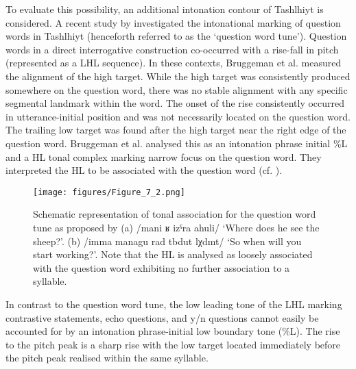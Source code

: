 To evaluate this possibility, an additional intonation contour of Tashlhiyt is considered. A recent study by \citet{Bruggeman.etal2017} investigated the intonational marking of question words in Tashlhiyt (henceforth referred to as the ‘question word tune’). Question words in a direct interrogative construction co-occurred with a rise-fall in pitch (represented as a LHL sequence). In these contexts, Bruggeman et al. measured the alignment of the high target. While the high target was consistently produced somewhere on the question word, there was no stable alignment with any specific segmental landmark within the word. The onset of the rise consistently occurred in utterance-initial position and was not necessarily located on the question word. The trailing low target was found after the high target near the right edge of the question word. Bruggeman et al. analysed this as an intonation phrase initial \%L and a HL tonal complex marking narrow focus on the question word. They interpreted the HL to be associated with the question word (cf. ). 

  \begin{figure}[h!]
  \centering 
   \texttt{[image: figures/Figure\_7\_2.png]}
  \caption{Schematic representation of tonal association for the question word tune as proposed by \citet{Bruggeman.etal2017} (a) /mani ʁ izˤra ahuli/ ‘Where does he see the sheep?’. (b) /imma managu rad tbdut lχdmt/ ‘So when will you start working?’. Note that the HL is analysed as loosely associated with the question word exhibiting no further association to a syllable.}
   \label{fig:7.2}
   \end{figure}
   
In contrast to the question word tune, the low leading tone of the LHL marking contrastive statements, echo questions, and y/n questions cannot easily be accounted for by an intonation phrase-initial low boundary tone (\%L). The rise to the pitch peak is a sharp rise with the low target located immediately before the pitch peak realised within the same syllable. 


